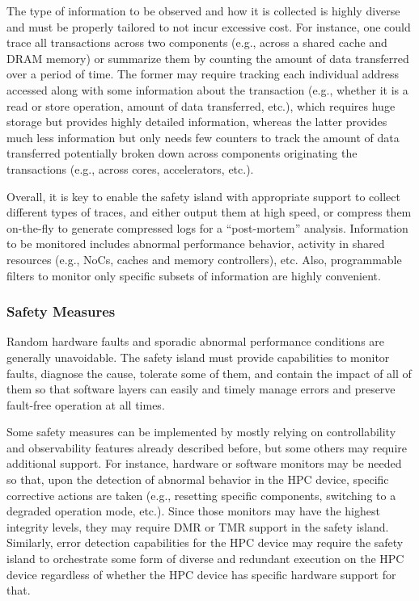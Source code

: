 The type of information to be observed and how it is collected is highly diverse and must be properly tailored to not incur excessive cost. For instance, one could trace all transactions across two components (e.g., across a shared cache and DRAM memory) or summarize them by counting the amount of data transferred over a period of time. The former may require tracking each individual address accessed along with some information about the transaction (e.g., whether it is a read or store operation, amount of data transferred, etc.), which requires huge storage but provides highly detailed information, whereas the latter provides much less information but only needs few counters to track the amount of data transferred potentially broken down across components originating the transactions (e.g., across cores, accelerators, etc.). 

Overall, it is key to enable the safety island with appropriate support to collect different types of traces, and either output them at high speed, or compress them on-the-fly to generate compressed logs for a ``post-mortem'' analysis. Information to be monitored includes abnormal performance behavior, activity in shared resources (e.g., NoCs, caches and memory controllers), etc. Also, programmable filters to monitor only specific subsets of information are highly convenient.


\subsubsection{Safety Measures}

Random hardware faults and sporadic abnormal performance conditions are generally unavoidable. The safety island must provide capabilities to monitor faults, diagnose the cause, tolerate some of them, and contain the impact of all of them so that software layers can easily and timely manage errors and preserve fault-free operation at all times.

Some safety measures can be implemented by mostly relying on controllability and observability features already described before, but some others may require additional support. For instance, hardware or software monitors may be needed so that, upon the detection of abnormal behavior in the HPC device, specific corrective actions are taken (e.g., resetting specific components, switching to a degraded operation mode, etc.). Since those monitors may have the highest integrity levels, they may require DMR or TMR support in the safety island. Similarly, error detection capabilities for the HPC device may require the safety island to orchestrate some form of diverse and redundant execution on the HPC device regardless of whether the HPC device has specific hardware support for that.





